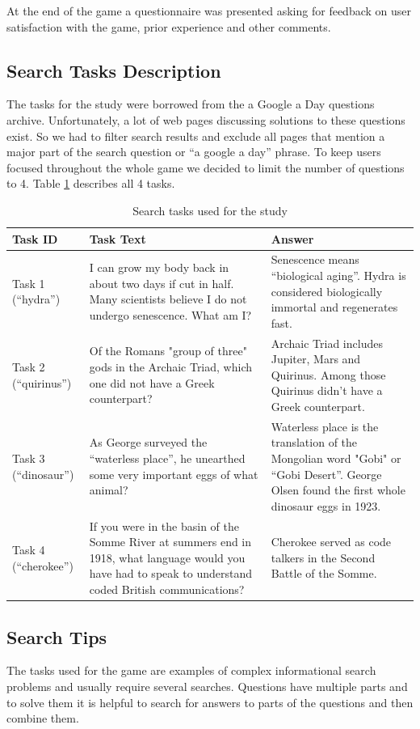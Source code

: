 \documentclass{sig-alternate}
\begin{document}
At the end of the game a questionnaire was presented asking for feedback on user satisfaction with the game, prior experience and other comments.

\subsection{Search Tasks Description}

The tasks for the study were borrowed from the a Google a Day questions archive. Unfortunately, a lot of web pages discussing solutions to these questions exist. So we had to filter search results and exclude all pages that mention a major part of the search question or ``a google a day'' phrase.
To keep users focused throughout the whole game we decided to limit the number of questions to 4.
Table \ref{table:tasks} describes all 4 tasks.

\begin{table}
\centering
\caption{Search tasks used for the study}
\label{table:tasks}
\begin{tabular}{|l|p{6cm}|p{8cm}|} \hline
Task ID & Task Text & Answer \\ \hline
Task 1 (``hydra'') & I can grow my body back in about two days if cut in half. Many scientists believe I do not undergo senescence. What am I? & Senescence means ``biological aging''. Hydra is considered biologically immortal and regenerates fast. \\ \hline
Task 2 (``quirinus'') & Of the Romans "group of three" gods in the Archaic Triad, which one did not have a Greek counterpart? & Archaic Triad includes Jupiter, Mars and Quirinus. Among those Quirinus didn't have a Greek counterpart.\\ \hline
Task 3 (``dinosaur'') & As George surveyed the ``waterless place'', he unearthed some very important eggs of what animal? & Waterless place is the translation of the Mongolian word "Gobi" or ``Gobi Desert''. George Olsen found the first whole dinosaur eggs in 1923. \\ \hline
Task 4 (``cherokee'') & If you were in the basin of the Somme River at summers end in 1918, what language would you have had to speak to understand coded British communications? & Cherokee served as code talkers in the Second Battle of the Somme. \\ \hline
\end{tabular}
\end{table}

\subsection{Search Tips}
The tasks used for the game are examples of complex informational search problems and usually require several searches. Questions have multiple parts and to solve them it is helpful to search for answers to parts of the questions and then combine them.
\end{document}
